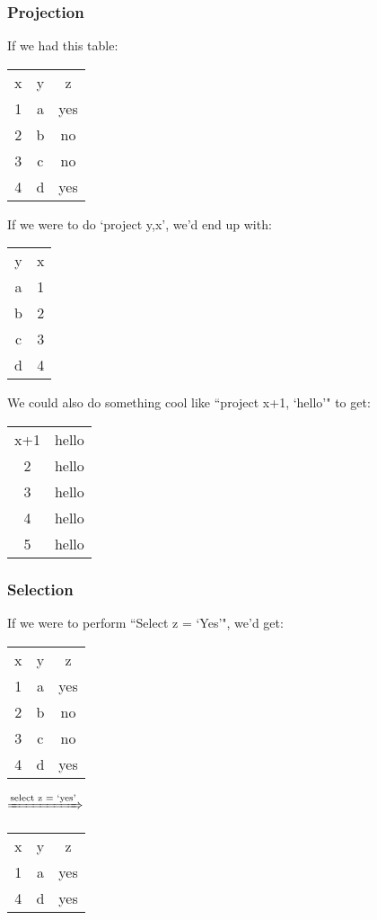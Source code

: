\documentclass[11pt,a4paper,titlepage,dvipsnames,cmyk]{scrartcl}
\begin{document}
\subsubsection{Projection}%
\label{ssub:projection}
If we had this table:

\begin{center}
    \begin{tabular}{c|c|c}
        x & y & z \\
        \hhline{=|=|=}
        1 & a & yes \\
        2 & b & no \\
        3 & c & no \\
        4 & d & yes
    \end{tabular}
\end{center}

If we were to do `project y,x', we'd end up with:

\begin{center}
    \begin{tabular}{c|c}
        y & x \\ \hhline{=|=}
        a & 1 \\
        b & 2 \\
        c & 3 \\
        d & 4
    \end{tabular}
\end{center}

We could also do something cool like ``project x+1, `hello'" to get:

\begin{center}
    \begin{tabular}{c|c}
        x+1 & hello \\ \hhline{=|=}
        2 & hello \\
        3 & hello \\
        4 & hello \\
        5 & hello \\
    \end{tabular}
\end{center}
\newpage

\subsubsection{Selection}%
\label{ssub:selection}
If we were to perform ``Select z = `Yes'", we'd get:

\begin{center}
    \begin{tabular}{c|c|c}
        x & y & z \\
        \hhline{=|=|=}
        1 & a & yes \\
        2 & b & no \\
        3 & c & no \\
        4 & d & yes
    \end{tabular}
    \quad \quad $\xRightarrow{\text{select z = `yes'}}$ \quad \quad
    \begin{tabular}{c|c|c}
        x & y & z \\ \hhline{=|=|=}
        1 & a & yes \\
        4 & d & yes
    \end{tabular}
\end{center}
\end{document}
